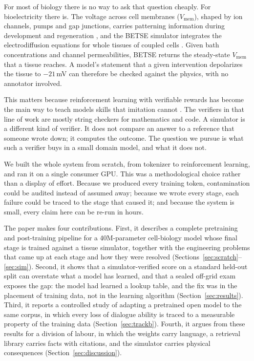 \documentclass[11pt]{article}
\newcommand{\Vm}{V_\mathrm{mem}}
\begin{document}
For most of biology there is no way to ask that question cheaply. For
bioelectricity there is. The voltage across cell membranes ($\Vm$), shaped
by ion channels, pumps and gap junctions, carries patterning information
during development and regeneration \citep{levin2021bioelectric}, and the
BETSE simulator integrates the electrodiffusion equations for whole
tissues of coupled cells \citep{pietak2016exploring}. Given bath
concentrations and channel permeabilities, BETSE returns the steady-state
$\Vm$ that a tissue reaches. A model's statement that a given intervention
depolarizes the tissue to $-21$\,mV can therefore be checked against the
physics, with no annotator involved.

This matters because reinforcement learning with verifiable rewards has
become the main way to teach models skills that imitation cannot
\citep{lambert2024tulu,shao2024deepseekmath,deepseek2025r1}. The verifiers
in that line of work are mostly string checkers for mathematics and code. A
simulator is a different kind of verifier. It does not compare an answer to
a reference that someone wrote down; it computes the outcome. The question
we pursue is what such a verifier buys in a small domain model, and what it
does not.

We built the whole system from scratch, from tokenizer to reinforcement
learning, and ran it on a single consumer GPU. This was a methodological
choice rather than a display of effort. Because we produced every training
token, contamination could be audited instead of assumed away; because we
wrote every stage, each failure could be traced to the stage that caused
it; and because the system is small, every claim here can be re-run in
hours.

The paper makes four contributions. First, it describes a complete
pretraining and post-training pipeline for a 40M-parameter cell-biology
model whose final stage is trained against a tissue simulator, together with
the engineering problems that came up at each stage and how they were
resolved (Sections~\ref{sec:scratch}--\ref{sec:sim}). Second, it shows that
a simulator-verified score on a standard held-out split can overstate what
a model has learned, and that a sealed off-grid exam exposes the gap: the
model had learned a lookup table, and the fix was in the placement of
training data, not in the learning algorithm (Section~\ref{sec:results}).
Third, it reports a controlled study of adapting a pretrained open model to
the same corpus, in which every loss of dialogue ability is traced to a
measurable property of the training data (Section~\ref{sec:trackb}). Fourth,
it argues from these results for a division of labour, in which the weights
carry language, a retrieval library carries facts with citations, and the
simulator carries physical consequences (Section~\ref{sec:discussion}).
\end{document}
